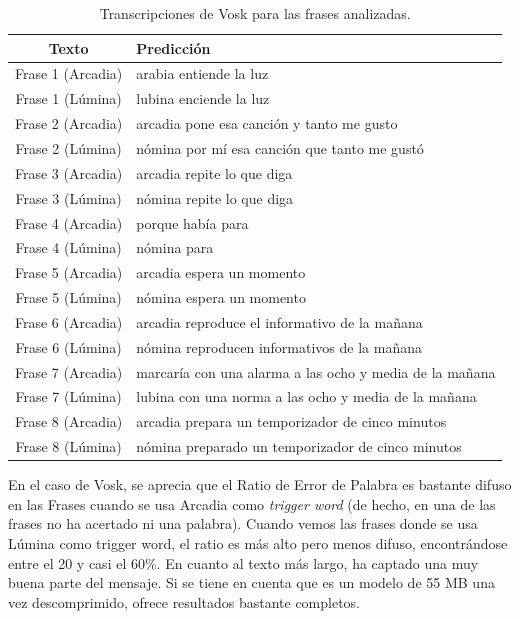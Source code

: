 \begin{table}
\begin{tabularx}{\textwidth}{|c|X|}
	\hline
	Texto & Predicción \\ \hline
	 Frase 1 (Arcadia) & arabia entiende la luz \\ \hline
	 Frase 1 (Lúmina) & lubina enciende la luz  \\ \hline
	 Frase 2 (Arcadia)& arcadia pone esa canción y tanto me gusto \\ \hline
	 Frase 2 (Lúmina)& nómina por mí esa canción que tanto me gustó \\ \hline
	 Frase 3 (Arcadia)& arcadia repite lo que diga \\ \hline
	 Frase 3 (Lúmina)& nómina repite lo que diga \\ \hline
	 Frase 4 (Arcadia)& porque había para \\ \hline
	 Frase 4 (Lúmina)& nómina para \\ \hline
	 Frase 5 (Arcadia)& arcadia espera un momento \\ \hline
	 Frase 5 (Lúmina)& nómina espera un momento \\ \hline
	 Frase 6 (Arcadia)& arcadia reproduce el informativo de la mañana \\ \hline
	 Frase 6 (Lúmina)& nómina reproducen informativos de la mañana \\ \hline
	 Frase 7 (Arcadia)& marcaría con una alarma a las ocho y media de la mañana \\ \hline
	 Frase 7 (Lúmina)& lubina con una norma a las ocho y media de la mañana \\ \hline
	 Frase 8 (Arcadia)& arcadia prepara un temporizador de cinco minutos \\ \hline
	 Frase 8 (Lúmina)& nómina preparado un temporizador de cinco minutos \\ \hline

\end{tabularx}
\caption{Transcripciones de Vosk para las frases analizadas.}
\end{table}

En el caso de Vosk, se aprecia que el Ratio de Error de Palabra es bastante difuso en las Frases cuando se usa Arcadia como \textit{trigger word} (de hecho, en una de las frases no ha acertado ni una palabra). Cuando vemos las frases donde se usa Lúmina como trigger word, el ratio es más alto pero menos difuso, encontrándose entre el 20 y casi el 60\%. En cuanto al texto más largo, ha captado una muy buena parte del mensaje. 
Si se tiene en cuenta que es un modelo de 55 MB una vez descomprimido, ofrece resultados bastante completos.

